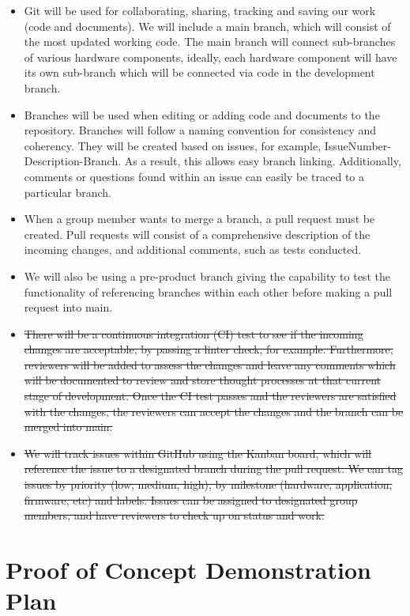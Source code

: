 \documentclass[12pt, titlepage]{article}
\begin{document}
\begin{itemize}
	\item Git will be used for collaborating, sharing, tracking and saving our work (code and documents). We will include a main branch, which will consist of the most updated working code. The main branch will connect sub-branches of various hardware components, ideally, each hardware component will have its own sub-branch which will be connected via code in the development branch.
	
	\item Branches will be used when editing or adding code and documents to the repository. Branches will follow a naming convention for consistency and coherency. They will be created based on issues, for example, IssueNumber-Description-Branch. As a result, this allows easy branch linking. Additionally, comments or questions found within an issue can easily be traced to a particular branch. 
	
	\item When a group member wants to merge a branch, a pull request must be created. Pull requests will consist of a comprehensive description of the incoming changes, and additional comments, such as tests conducted. 
	
	\item We will also be using a pre-product branch giving the capability to test the functionality of referencing branches within each other before making a pull request into main.
	
	\item \sout{There will be a continuous integration (CI) test to see if the incoming changes are acceptable, by passing a linter check, for example. Furthermore, reviewers will be added to assess the changes and leave any comments which will be documented to review and store thought processes at that current stage of development. Once the CI test passes and the reviewers are satisfied with the changes, the reviewers can accept the changes and the branch can be merged into main. 
	}
	\item \sout{We will track issues within GitHub using the Kanban board, which will reference the issue to a designated branch during the pull request. We can tag issues by priority (low, medium, high), by milestone (hardware, application, firmware, etc) and labels. Issues can be assigned to designated group members, and have reviewers to check up on status and work. 
	}
\end{itemize}

\section{Proof of Concept Demonstration Plan}
\end{document}
